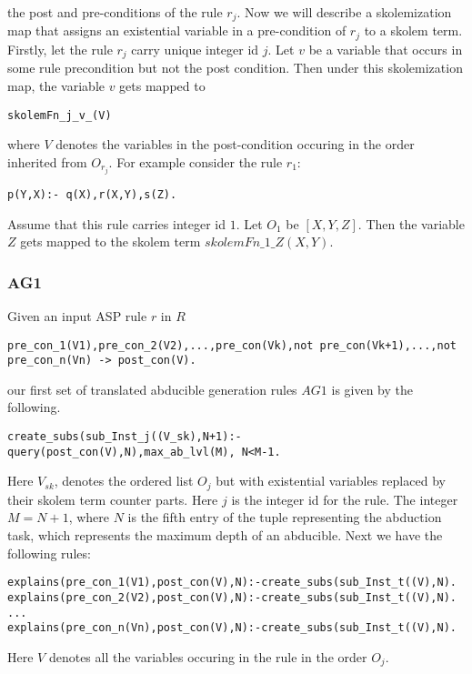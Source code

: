 the post and pre-conditions of the rule $r_{j}$. Now we will describe a
skolemization map that assigns an existential variable in a pre-condition of
$r_{j}$ to a skolem term. Firstly, let the rule $r_{j}$ carry unique integer
id $j$. Let $v$ be a variable that occurs in some rule precondition but not
the post condition. Then under this skolemization map, the variable $v$ gets
mapped to
\begin{lstlisting}[frame=none]
skolemFn_j_v_(V)    
\end{lstlisting}
where $V$ denotes the variables in the post-condition occuring in the order inherited from $O_{r_{j}}$. For example consider the rule $r_{1}$: 
\begin{lstlisting}[frame=none]
p(Y,X):- q(X),r(X,Y),s(Z).    
\end{lstlisting} 
Assume that this rule carries integer id $1$. Let $O_{1}$ be $[X,Y,Z]$. Then
the variable $Z$ gets mapped to the skolem term $skolemFn\_1\_Z(X,Y)$.

\subsubsection{AG1}
Given an input ASP rule $r$ in $R$
\begin{lstlisting}[frame=none]
pre_con_1(V1),pre_con_2(V2),...,pre_con(Vk),not pre_con(Vk+1),...,not pre_con_n(Vn) -> post_con(V).
\end{lstlisting}
our first set of translated abducible generation rules $AG1$ is given by the following. 
\begin{lstlisting}[frame=none]
create_subs(sub_Inst_j((V_sk),N+1):-query(post_con(V),N),max_ab_lvl(M), N<M-1.
\end{lstlisting}
Here $V_{sk}$, denotes the ordered list $O_{j}$ but with existential variables replaced by their skolem term counter parts. Here $j$ is the integer id for the rule. The integer $M=N+1$, where $N$ is the fifth entry of the tuple representing the abduction task, which represents the maximum depth of an abducible.
Next we have the following rules:
\begin{lstlisting}[frame=none]
explains(pre_con_1(V1),post_con(V),N):-create_subs(sub_Inst_t((V),N).
explains(pre_con_2(V2),post_con(V),N):-create_subs(sub_Inst_t((V),N).
...
explains(pre_con_n(Vn),post_con(V),N):-create_subs(sub_Inst_t((V),N).
\end{lstlisting}
Here $V$ denotes all the variables occuring in the rule in the order $O_{j}$.
